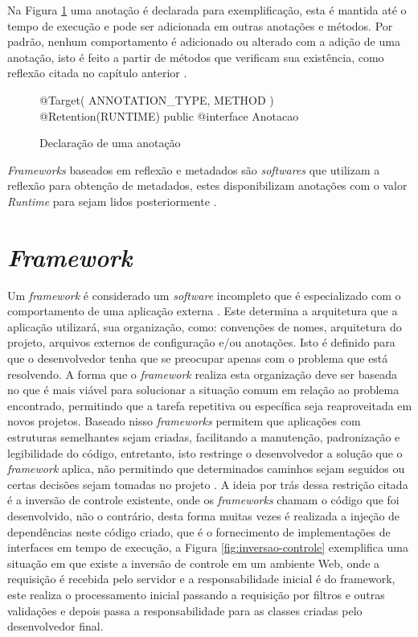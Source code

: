\par Na Figura \ref{fig:declaracao-anotacao} uma anotação é declarada para exemplificação, esta é mantida até o tempo de execução e pode ser adicionada em outras anotações e métodos. Por padrão, nenhum comportamento é adicionado ou alterado com a adição de uma anotação, isto é feito a partir de métodos que verificam sua existência, como reflexão citada no capítulo anterior \cite{bloch2004jsr}. 

\begin{figure}[H]
    \centering
    \caption{Declaração de uma anotação}
    \begin{java}
@Target({ ANNOTATION_TYPE, METHOD })
@Retention(RUNTIME)
public @interface Anotacao {
}
    \end{java}
    \label{fig:declaracao-anotacao}
\end{figure}

\textit{Frameworks} baseados em reflexão e metadados são \textit{softwares} que utilizam a reflexão para obtenção de metadados, estes disponibilizam anotações com o valor \textit{Runtime} para sejam lidos posteriormente \cite{guerra2009pattern}.

\section{\textit{Framework}}

\par Um \textit{framework} é considerado um \textit{software} incompleto que é especializado com o comportamento de uma aplicação externa \cite{johnson1988designing}. Este determina a arquitetura que a aplicação utilizará, sua organização, como: convenções de nomes, arquitetura do projeto, arquivos externos de configuração e/ou anotações. Isto é definido para que o desenvolvedor tenha que se preocupar apenas com o problema que está resolvendo. A forma que o \textit{framework} realiza esta organização deve ser baseada no que é mais viável para solucionar a situação comum em relação ao problema encontrado, permitindo que a tarefa repetitiva ou específica seja reaproveitada em novos projetos.
Baseado nisso \textit{frameworks} permitem que aplicações com estruturas semelhantes sejam criadas, facilitando a manutenção, padronização e legibilidade do código, entretanto, isto restringe o desenvolvedor a solução que o \textit{framework} aplica, não permitindo que determinados caminhos sejam seguidos ou certas decisões sejam tomadas no projeto \cite{gamma2009padroes}. A ideia por trás dessa restrição citada é a inversão de controle existente, onde os \textit{frameworks} chamam o código que foi desenvolvido, não o contrário, desta forma muitas vezes é realizada a injeção de dependências neste código criado, que é o fornecimento de implementações de interfaces em tempo de execução, a Figura \ref{fig:inversao-controle} exemplifica uma situação em que existe a inversão de controle em um ambiente Web, onde a requisição é recebida pelo servidor e a responsabilidade inicial é do framework, este realiza o processamento inicial passando a requisição por filtros e outras validações e depois passa a responsabilidade para as classes criadas pelo desenvolvedor final.

